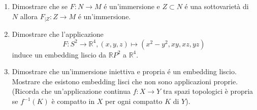 \documentclass[80pt,defrtgr]{report}
\newcommand{\R}{\mathbb{R}}
\begin{document}
\begin{enumerate}
 \item
 Dimostrare che se $F:N\rightarrow M$ \'e un'immersione e $Z\subset N$ \'e una sottovariet\`a di $N$ allora 
 $F_{|Z}:Z\rightarrow M$ \'e un'immersione.
 \item
Dimostrare che l'applicazione
 $$F:S^2\rightarrow \R^4, (x, y, z)\mapsto (x^2-y^2, xy, xz, yz)$$
 induce un embedding liscio da $\R P^2$ a $\R^4$.
 \item
 Dimostrare che un'immersione iniettiva e propria \'e un embedding liscio. Mostrare che esistono embedding lisci che non sono applicazioni  proprie.
 (Ricorda che un'applicazione continua $f:X\rightarrow Y$ tra spazi topologici è propria se $f^{-1}(K)$ è compatto in $X$ per ogni compatto $K$ di $Y$).
 
 \end{enumerate}
\end{document}
